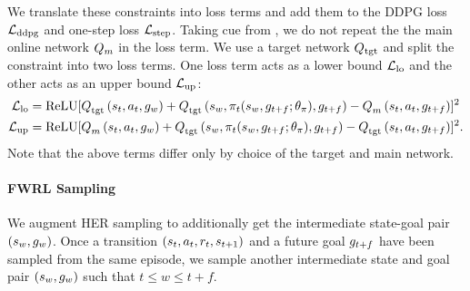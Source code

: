 We translate these constraints into loss terms and add them to the
DDPG loss $\LossDDPG$ and one-step loss $\LossStep$.
Taking cue from \citet{mnih2015human}, we do
not repeat the the main online network $\Q_{m}$ in the loss term. We use
a target network $\Qtgt$ and split the constraint into two loss terms. One loss term acts
as a lower bound $\LossLo$ and the other acts as an upper bound $\LossUp$:
%
\begin{align}
  \LossLo &= \text{ReLU}[
      \fwargs{\state_{t}}{\act_t}{\goal_{w}}{\tgt}{}
      + \fwargs{\state_{w}}{\policy_t(\state_{w}, \goal_{t+f};\param_\policy)}{\goal_{t+f}}{\tgt}{}
      - \fwargs{\state_{t}}{\act_t}{\goal_{t+f}}{m}{}
      ]^2
                         \\
  \LossUp &= \text{ReLU}[
      \fwargs{\state_{t}}{\act_t}{\goal_{w}}{m}{}
      + \fwargs{\state_{w}}{\policy_t(\state_{w}, \goal_{t+f};\param_\policy)}{\goal_{t+f}}{\tgt}{}
      - \fwargs{\state_{t}}{\act_t}{\goal_{t+f}}{\tgt}{}
      ]^2.
\end{align}%
% 
Note that the above terms differ only by choice of the target and main network. 

\paragraph{FWRL Sampling}
We augment HER sampling to additionally get the intermediate state-goal pair
$(\state_{w}, \goal_{w})$.
Once a transition $(\state_t, \act_t, \rew_t, \state_{t+1})$ and a
future goal $\goal_{t+f}$ have been sampled from the same episode, we sample
another intermediate state and goal pair $(\state_{w}, \goal_{w})$ such that
$t \le w \le t + f$.
% 


